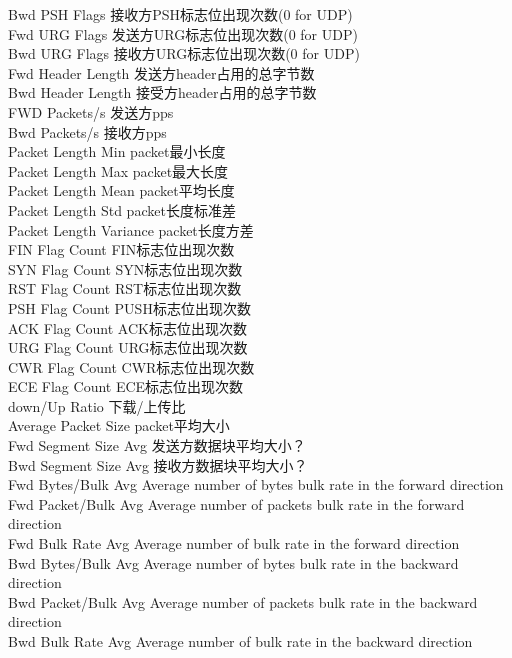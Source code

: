 Bwd PSH Flags			接收方PSH标志位出现次数(0 for UDP)\\
Fwd URG Flags			发送方URG标志位出现次数(0 for UDP) \\
Bwd URG Flags			接收方URG标志位出现次数(0 for UDP) \\
Fwd Header Length		发送方header占用的总字节数 \\
Bwd Header Length		接受方header占用的总字节数 \\
FWD Packets/s			发送方pps \\
Bwd Packets/s			接收方pps \\
Packet Length Min 		packet最小长度 \\
Packet Length Max		packet最大长度 \\
Packet Length Mean 		packet平均长度 \\
Packet Length Std		packet长度标准差 \\
Packet Length Variance  	packet长度方差 \\
FIN Flag Count 			FIN标志位出现次数 \\
SYN Flag Count 			SYN标志位出现次数 \\
RST Flag Count 			RST标志位出现次数 \\
PSH Flag Count 			PUSH标志位出现次数 \\
ACK Flag Count 			ACK标志位出现次数 \\
URG Flag Count 			URG标志位出现次数 \\
CWR Flag Count 			CWR标志位出现次数 \\
ECE Flag Count 			ECE标志位出现次数 \\
down/Up Ratio			下载/上传比 \\
Average Packet Size 		packet平均大小 \\
Fwd Segment Size Avg 		发送方数据块平均大小？\\
Bwd Segment Size Avg 		接收方数据块平均大小？\\
Fwd Bytes/Bulk Avg		Average number of bytes bulk rate in the forward direction \\
Fwd Packet/Bulk Avg		Average number of packets bulk rate in the forward direction \\
Fwd Bulk Rate Avg 		Average number of bulk rate in the forward direction \\
Bwd Bytes/Bulk Avg		Average number of bytes bulk rate in the backward direction \\
Bwd Packet/Bulk Avg 		Average number of packets bulk rate in the backward direction \\
Bwd Bulk Rate Avg		Average number of bulk rate in the backward direction \\
